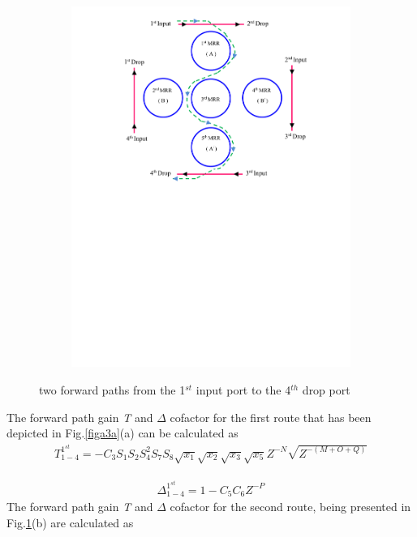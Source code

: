 \documentclass{osa-article}
\begin{document}
\begin{figure}[h!]
\begin{subfigure}[b]{0.4\linewidth}
    \includegraphics[width=\linewidth]{figs/fig3a_142.pdf}
    \caption{}
  \end{subfigure}
  \caption{two forward paths from the 1$^{st}$ input port to the 4$^{th}$ drop port}
  \label{fig3a}
\end{figure}

The forward path gain \textit {T} and $\Delta$ cofactor for the first route that has been depicted in Fig.\ref{figa3a}(a) can be calculated as\\

\begin{equation}
\begin{split}
T^{1^{st}}_{1-4}=-C_3S_1S_2{S^2_{4}}S_7S_8\sqrt{x_1}\sqrt{x_2}\sqrt{x_3}\sqrt{x_5}Z^{-N}\sqrt{Z^{-(M+O+Q)}}
 \label{eqa51}
\end{split}
\end{equation}

\begin{equation}
\begin{split}
\Delta^{1^{st}}_{1-4}=1-C_5C_6Z^{-P}
 \label{eqa52}
\end{split}
\end{equation}
The forward path gain \textit {T} and $\Delta$ cofactor for the second route, being presented in Fig.\ref{fig3a}(b) are calculated as
\end{document}
